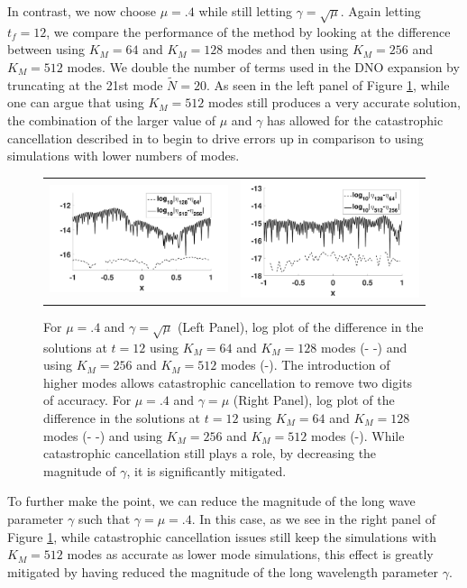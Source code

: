 \documentclass[a4paper,11pt]{article}
\begin{document}
In contrast, we now choose $\mu=.4$ while still letting $\gamma=\sqrt{\mu}$.  Again letting $t_{f} =12$, we compare the performance of the method by looking at the difference between using $K_{M}=64$ and $K_{M}=128$ modes and then using $K_{M}=256$ and $K_{M}=512$ modes.  We double the number of terms used in the DNO expansion by truncating at the 21st mode $\tilde{N}=20$.  As seen in the left panel of Figure \ref{fig:convcompfail}, while one can argue that using $K_{M}=512$  modes still produces a very accurate solution, the combination of the larger value of $\mu$ and $\gamma$ has allowed for the catastrophic cancellation described in \cite{wilkening} to begin to drive errors up in comparison to using simulations with lower numbers of modes.   
\begin{figure}[h]
\centering
\begin{tabular}{cc}
\includegraphics[width=.48\textwidth]{conv_plot_mupt4_tf_12} & \includegraphics[width=.48\textwidth]{conv_plot_mupt4_gampt4_tf_12}
\end{tabular}
\caption{  For $\mu=.4$ and $\gamma=\sqrt{\mu}$ (Left Panel), log plot of the difference in the solutions at $t=12$ using $K_{M}=64$ and $K_{M}=128$ modes (- -) and using $K_{M}=256$ and $K_{M}=512$ modes (-).  The introduction of higher modes allows catastrophic cancellation to remove two digits of accuracy. For $\mu=.4$ and $\gamma=\mu$ (Right Panel), log plot of the difference in the solutions at $t=12$ using $K_{M}=64$ and $K_{M}=128$ modes (- -) and using $K_{M}=256$ and $K_{M}=512$ modes (-). While catastrophic cancellation still plays a role, by decreasing the magnitude of $\gamma$, it is significantly mitigated.}
\label{fig:convcompfail}
\end{figure}
To further make the point, we can reduce the magnitude of the long wave parameter $\gamma$ such that $\gamma=\mu=.4$.  In this case, as we see in the right panel of Figure \ref{fig:convcompfail}, while catastrophic cancellation issues still keep the simulations with $K_{M}=512$ modes as accurate as lower mode simulations, this effect is greatly mitigated by having reduced the magnitude of the long wavelength parameter $\gamma$.
\end{document}
